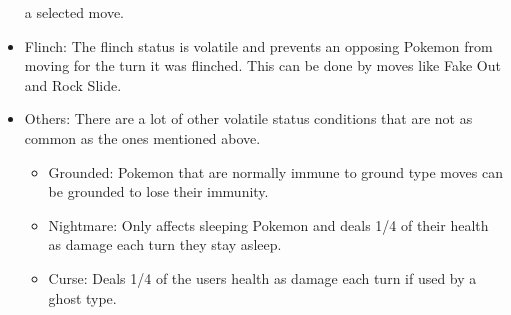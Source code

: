 \begin{itemize}
    a selected move.
  \item Flinch: The flinch status is volatile and prevents an opposing Pokemon from moving for the turn it was flinched. This can be done by moves like 
    Fake Out and Rock Slide.
  \item Others: There are a lot of other volatile status conditions that are not as common as the ones mentioned above.
  \begin{itemize}
    \item Grounded: Pokemon that are normally immune to ground type moves can be grounded to lose their immunity.
    \item Nightmare: Only affects sleeping Pokemon and deals 1/4 of their health as damage each turn they stay asleep.
    \item Curse: Deals 1/4 of the users health as damage each turn if used by a ghost type. 
  \end{itemize}
\end{itemize}
